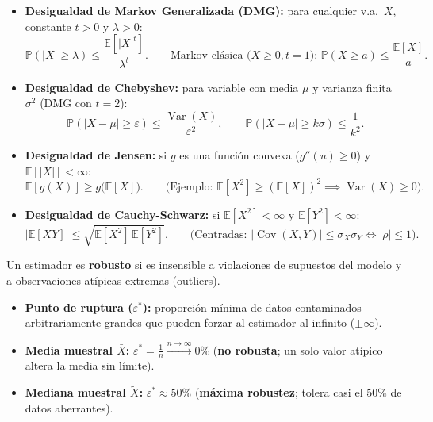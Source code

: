 \documentclass[10pt,a4paper]{article}
\newcommand{\E}{\mathbb{E}}
\newcommand{\Prob}{\mathbb{P}}
\newcommand{\Var}{\operatorname{Var}}
\newcommand{\Cov}{\operatorname{Cov}}
\begin{document}
\begin{notebox}[frametitle={Desigualdades clásicas fundamentales}]
\begin{itemize}
  \item \textbf{Desigualdad de Markov Generalizada (DMG):} para cualquier v.a.\ $X$, constante $t > 0$ y $\lambda > 0$:
  \[
  \Prob(|X| \ge \lambda) \le \frac{\E[|X|^t]}{\lambda^t}.
  \qquad \text{Markov clásica ($X\ge 0, t=1$): } \Prob(X \ge a) \le \frac{\E[X]}{a}.
  \]
  \item \textbf{Desigualdad de Chebyshev:} para variable con media $\mu$ y varianza finita $\sigma^2$ (DMG con $t=2$):
  \[
  \Prob(|X - \mu| \ge \varepsilon) \le \frac{\Var(X)}{\varepsilon^2}, \qquad \Prob(|X - \mu| \ge k\sigma) \le \frac{1}{k^2}.
  \]
  \item \textbf{Desigualdad de Jensen:} si $g$ es una función convexa ($g''(u) \ge 0$) y $\E[|X|] < \infty$:
  \[
  \E[g(X)] \ge g\big(\E[X]\big). \qquad \big(\text{Ejemplo: } \E[X^2] \ge (\E[X])^2 \implies \Var(X) \ge 0\big).
  \]
  \item \textbf{Desigualdad de Cauchy-Schwarz:} si $\E[X^2] < \infty$ y $\E[Y^2] < \infty$:
  \[
  \big|\E[XY]\big| \le \sqrt{\E[X^2]\,\E[Y^2]}. \qquad \big(\text{Centradas: } |\Cov(X,Y)| \le \sigma_X \sigma_Y \iff |\rho| \le 1\big).
  \]
\end{itemize}
\end{notebox}

\begin{warnbox}[frametitle={Robustez de estimadores y Punto de Ruptura (Breakdown Point)}]
Un estimador es \textbf{robusto} si es insensible a violaciones de supuestos del modelo y a observaciones atípicas extremas (outliers).
\begin{itemize}
  \item \textbf{Punto de ruptura ($\varepsilon^*$):} proporción mínima de datos contaminados arbitrariamente grandes que pueden forzar al estimador al infinito ($\pm\infty$).
  \item \textbf{Media muestral $\bar X$:} $\varepsilon^* = \frac{1}{n} \xrightarrow{n\to\infty} 0\%$ (\textbf{no robusta}; un solo valor atípico altera la media sin límite).
  \item \textbf{Mediana muestral $\tilde X$:} $\varepsilon^* \approx 50\%$ (\textbf{máxima robustez}; tolera casi el $50\%$ de datos aberrantes).
\end{itemize}
\end{warnbox}

\end{document}

